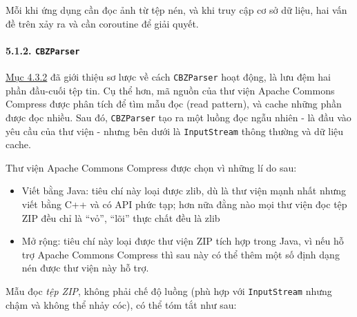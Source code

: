 \documentclass[
]{article}
\begin{document}
Mỗi khi ứng dụng cần đọc ảnh từ tệp nén, và khi truy cập cơ sở dữ liệu,
hai vấn đề trên xảy ra và cần coroutine để giải quyết.

\hypertarget{cbzparser}{%
\paragraph{\texorpdfstring{5.1.2.
\texttt{CBZParser}}{5.1.2. CBZParser}}\label{cbzparser}}

\protect\hyperlink{P4.3.2-cbzparser}{Mục 4.3.2} đã giới thiệu sơ lược về
cách \texttt{CBZParser} hoạt động, là lưu đệm hai phần đầu-cuối tệp tin.
Cụ thể hơn, mã nguồn của thư viện Apache Commons Compress được phân tích
để tìm mẫu đọc (read pattern), và cache những phần được đọc nhiều. Sau
đó, \texttt{CBZParser} tạo ra một luồng đọc ngẫu nhiên - là đầu vào yêu
cầu của thư viện - nhưng bên dưới là \texttt{InputStream} thông thường
và dữ liệu cache.

Thư viện Apache Commons Compress được chọn vì những lí do sau:

\begin{itemize}
\item
  Viết bằng Java: tiêu chí này loại được zlib, dù là thư viện mạnh nhất
  nhưng viết bằng C++ và có API phức tạp; hơn nữa đằng nào mọi thư viện
  đọc tệp ZIP đều chỉ là ``vỏ'', ``lõi'' thực chất đều là zlib
\item
  Mở rộng: tiêu chí này loại được thư viện ZIP tích hợp trong Java, vì
  nếu hỗ trợ Apache Commons Compress thì sau này có thể thêm một số định
  dạng nén được thư viện này hỗ trợ.
\end{itemize}

Mẫu đọc \emph{tệp ZIP}, không phải chế độ luồng (phù hợp với
\texttt{InputStream} nhưng chậm và không thể nhảy cóc), có thể tóm tắt
như sau:
\end{document}
